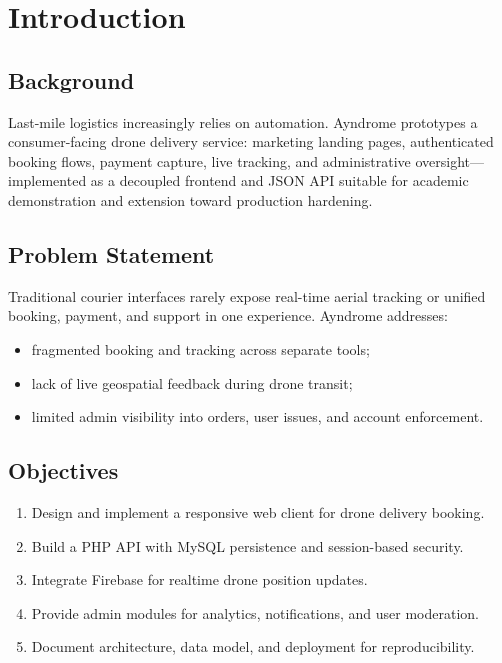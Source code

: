 \documentclass[12pt,a4paper,oneside]{report}
\begin{document}
\tableofcontents
\listoffigures
\listoftables
\clearpage
{}

\chapter{Introduction}

\section{Background}
Last-mile logistics increasingly relies on automation. Ayndrome prototypes a consumer-facing
drone delivery service: marketing landing pages, authenticated booking flows, payment capture,
live tracking, and administrative oversight---implemented as a decoupled frontend and JSON API
suitable for academic demonstration and extension toward production hardening.

\section{Problem Statement}
Traditional courier interfaces rarely expose real-time aerial tracking or unified booking,
payment, and support in one experience. Ayndrome addresses:
\begin{itemize}[noitemsep]
    \item fragmented booking and tracking across separate tools;
    \item lack of live geospatial feedback during drone transit;
    \item limited admin visibility into orders, user issues, and account enforcement.
\end{itemize}

\section{Objectives}
\begin{enumerate}[label=\arabic*.]
    \item Design and implement a responsive web client for drone delivery booking.
    \item Build a PHP API with MySQL persistence and session-based security.
    \item Integrate Firebase for realtime drone position updates.
    \item Provide admin modules for analytics, notifications, and user moderation.
    \item Document architecture, data model, and deployment for reproducibility.
\end{enumerate}
\end{document}
